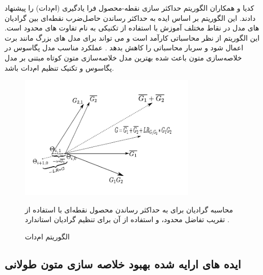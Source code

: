 کدیا
و همکاران الگوریتم حداکثر سازی نقطه-محصول فرا یادگیری (ام‌دات)
را پیشنهاد دادند.  این الگوریتم بر اساس ایده به حداکثر رساندن حاصل‌ضرب نقطه‌ای بین گرادیان های مدل در نقاط مختلف آموزش با استفاده از تکنیکی به نام تفاوت های محدود
است.  این الگوریتم از نظر محاسباتی کارآمد است  و می تواند برای مدل های بزرگ مانند برت اعمال شود و سربار محاسباتی را کاهش بدهد
\cite{sherborne2023meta}.
 عملکرد مناسب  مدل پگاسوس در خلاصه‌سازی متون باعث شده بهترین مدل خلاصه‌سازی متون کوتاه مبتنی بر مدل پگاسوس و   تکنیک تنظیم 
  ام‌دات باشد.

  \begin{figure}[!h]
 	\begin{center}
 		\includegraphics[height=6cm]{Mdot.png}
 	\end{center}
 	\caption{ الگوریتم ام‌دات \cite{sherborne2023meta}}
 	\label{fig:Mdot}
 	\medskip
 	\small{
 	 محاسبه گرادیان برای به حداکثر رساندن محصول نقطه‌ای با استفاده از تقریب تفاضل محدود، و استفاده از آن برای تنظیم گرادیان استاندارد
 	 \cite{sherborne2023meta}.
 }
 \end{figure}





\subsection{ایده های  ارایه شده بهبود خلاصه سازی متون طولانی }


